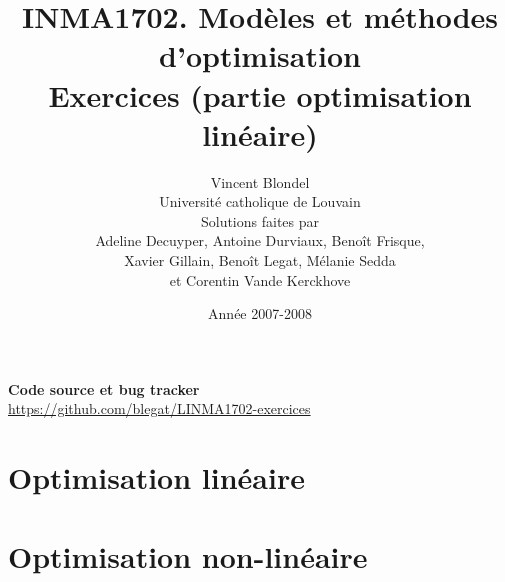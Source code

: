 \documentclass[11pt]{article}
\author{Vincent Blondel\\
Université catholique de Louvain\\
Solutions faites par\\
Adeline Decuyper, Antoine Durviaux, Benoît Frisque,\\
Xavier Gillain, Benoît Legat, Mélanie Sedda\\
et Corentin Vande Kerckhove}
\title{INMA1702. Mod\`eles et m\'ethodes d'optimisation
  \\
Exercices (partie optimisation linéaire)}
\begin{document}
\date{Année 2007-2008}

\maketitle

\begin{center}
\textbf{Code source et bug tracker}\\
\url{https://github.com/blegat/LINMA1702-exercices}
\end{center}

\newpage


\tableofcontents

\newpage

\part{Optimisation linéaire}



\newpage




\newpage




\newpage




\newpage




\newpage




\newpage




\newpage
\part{Optimisation non-linéaire}


\newpage

\end{document}
